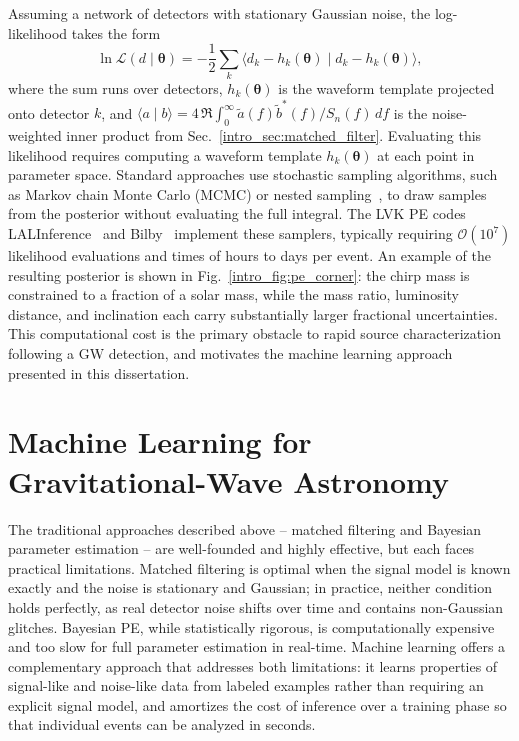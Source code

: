 \begin{refsection}
Assuming a network of detectors with stationary Gaussian noise, the log-likelihood takes the form
\begin{equation}
    \ln \mathcal{L}(d \mid \boldsymbol{\theta}) = -\frac{1}{2} \sum_k \langle d_k - h_k(\boldsymbol{\theta}) \mid d_k - h_k(\boldsymbol{\theta}) \rangle,
\end{equation}
where the sum runs over detectors, $h_k(\boldsymbol{\theta})$ is the waveform template projected onto detector $k$, and $\langle a \mid b \rangle = 4\, \Re \int_0^\infty \tilde{a}(f)\tilde{b}^*(f) / S_n(f)\, df$ is the noise-weighted inner product from Sec.~\ref{intro_sec:matched_filter}.
Evaluating this likelihood requires computing a waveform template $h_k(\boldsymbol{\theta})$ at each point in parameter space.
Standard approaches use stochastic sampling algorithms, such as Markov chain Monte Carlo (MCMC) or nested sampling~\cite{Skilling_2006}, to draw samples from the posterior without evaluating the full integral.
The LVK PE codes LALInference~\cite{lalinference_paper} and Bilby~\cite{Ashton_2019} implement these samplers, typically requiring $\mathcal{O}(10^7)$ likelihood evaluations and times of hours to days per event.
An example of the resulting posterior is shown in Fig.~\ref{intro_fig:pe_corner}: the chirp mass is constrained to a fraction of a solar mass, while the mass ratio, luminosity distance, and inclination each carry substantially larger fractional uncertainties.
This computational cost is the primary obstacle to rapid source characterization following a GW detection, and motivates the machine learning approach presented in this dissertation.

\section{Machine Learning for Gravitational-Wave Astronomy}
\label{intro_sec:ml}

The traditional approaches described above -- matched filtering and Bayesian parameter estimation -- are well-founded and highly effective, but each faces practical limitations.
Matched filtering is optimal when the signal model is known exactly and the noise is stationary and Gaussian; in practice, neither condition holds perfectly, as real detector noise shifts over time and contains non-Gaussian glitches.
Bayesian PE, while statistically rigorous, is computationally expensive and too slow for full parameter estimation in real-time.
Machine learning offers a complementary approach that addresses both limitations: it learns properties of signal-like and noise-like data from labeled examples rather than requiring an explicit signal model, and amortizes the cost of inference over a training phase so that individual events can be analyzed in seconds.


\end{refsection}

